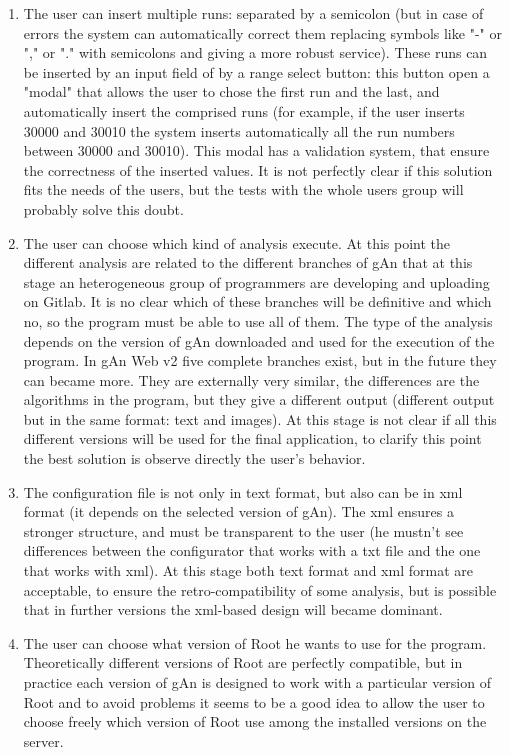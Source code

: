 \begin{enumerate}

\item The user can insert multiple runs: separated by a semicolon (but in case of errors the system can automatically correct them replacing symbols like "-" or "," or "." with semicolons and giving a more robust service). These runs can be inserted by an input field of by a range select button: this button open a "modal" that allows the user to chose the first run and the last, and automatically insert the comprised runs (for example, if the user inserts 30000 and 30010 the system inserts automatically all the run numbers between 30000 and 30010). This modal has a validation system, that ensure the correctness of the inserted values. It is not perfectly clear if this solution fits the needs of the users, but the tests with the whole users group will probably solve this doubt. 

\item The user can choose which kind of analysis execute. At this point the different analysis are related to the different branches of gAn that at this stage an heterogeneous group of programmers are developing and uploading on Gitlab. It is no clear which of these branches will be definitive and which no, so the program must be able to use all of them. The type of the analysis depends on the version of gAn downloaded and used for the execution of the program. In gAn Web v2 five complete branches exist, but in the future they can became more. They are externally very similar, the differences are the algorithms in the program, but they give a different output (different output but in the same format: text and images). 
At this stage is not clear if all this different versions will be used for the final application, to clarify this point the best solution is observe directly the user's behavior. 

\item The configuration file is not only in text format, but also can be in xml format (it depends on the selected version of gAn). The xml ensures a stronger structure, and must be transparent to the user (he mustn't see differences between the configurator that works with a txt file and the one that works with xml). At this stage both text format and xml format are acceptable, to ensure the retro-compatibility of some analysis, but is possible that in further versions the xml-based design will became dominant. 

\item The user can choose what version of Root he wants to use for the program. Theoretically different versions of Root are perfectly compatible, but in practice each version of gAn is designed to work with a particular version of Root and to avoid problems it seems to be a good idea to allow the user to choose freely which version of Root use among the installed versions on the server.  


\end{enumerate}

